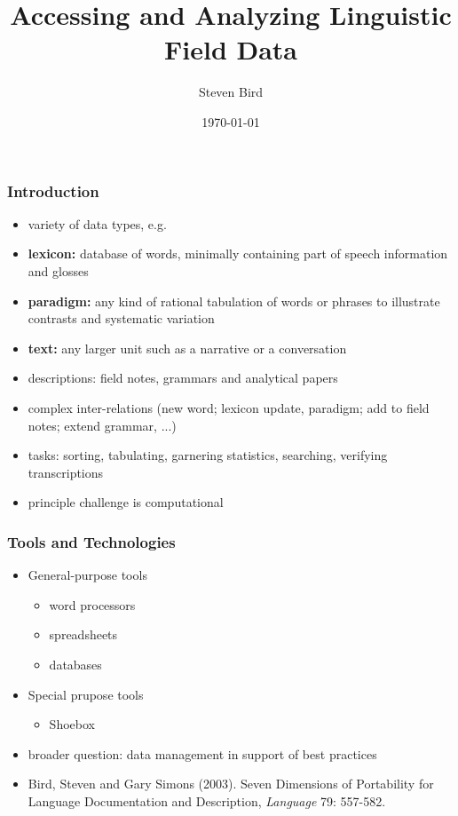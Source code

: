 \documentclass{beamer}
\title{Accessing and Analyzing Linguistic Field Data}
\author{Steven Bird}
\institute{
  University of Melbourne, AUSTRALIA
}
\date{\today}
\begin{document}
\begin{frame}
  \titlepage
\end{frame}


\begin{frame}
  \frametitle{Introduction}
  \begin{itemize}
  \item variety of data types, e.g.
  \item \textbf{lexicon:} database of words, minimally containing part
    of speech information and glosses
  \item \textbf{paradigm:} any kind of rational
    tabulation of words or phrases to illustrate contrasts and systematic
    variation
  \item \textbf{text:} any larger unit such as a narrative or a
    conversation
  \item descriptions: field notes, grammars and analytical papers
  \item complex inter-relations (new word; lexicon update, paradigm;
    add to field notes; extend grammar, ...)
  \item tasks: sorting, tabulating, garnering statistics, searching,
  verifying transcriptions
  \item principle challenge is computational
  \end{itemize}

\end{frame}

\begin{frame}
\frametitle{Tools and Technologies}
\begin{itemize}
\item General-purpose tools
  \begin{itemize}
  \item word processors
  \item spreadsheets
  \item databases
  \end{itemize}
\item Special prupose tools
  \begin{itemize}
  \item Shoebox
  \end{itemize}
\item broader question: data management in support of best practices
\item Bird, Steven and Gary Simons (2003).  Seven Dimensions of Portability
    for Language Documentation and Description, \textit{Language} 79: 557-582.
\end{itemize}
\end{frame}
\end{document}

